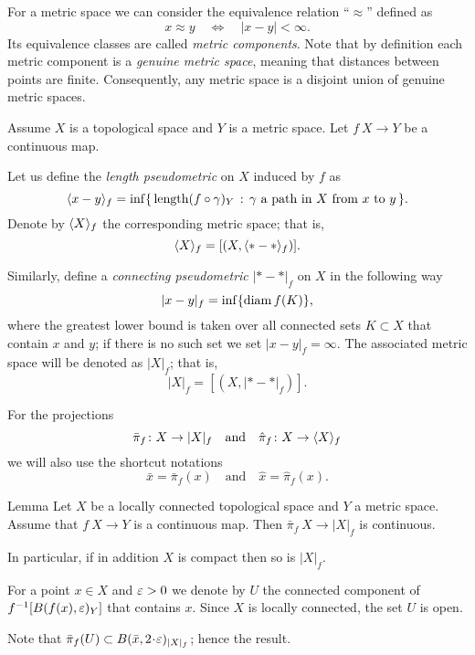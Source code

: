 \documentclass{article}
\begin{document}
For a metric space we can consider the equivalence relation ``$\approx$'' defined as 
\[x\approx y\quad\iff\quad|x-y|<\infty.\]
Its equivalence classes are called \emph{metric components}.
Note that by definition each metric component is a \emph{genuine metric space}, meaning that distances between points are finite.
Consequently, any metric space is a disjoint union of genuine metric spaces.

Assume $X$ is a topological space and $Y$ is a metric space.
Let $f\:X\to Y$ be a continuous map. 

Let us define the \emph{length pseudometric} on $X$ induced by $f$ as
\[\< x-y\>_f
=
\inf
\set{\length(f\circ\gamma)_Y}{\gamma\ \text{a path in}\  X\ \text{from}\ x\ \text{to}\ y}.\]
Denote by $\langle X\rangle_f$ the corresponding metric space; that is,
\[\langle X\rangle_f=[(X,\langle{*}-{*}\rangle_f)].\] 

Similarly, define a \emph{connecting pseudometric} $|{*}-{*}|_f$ on $X$ in
the following way
\[|x-y|_f=\inf\{\mathop{\rm diam}\nolimits f(K)\},\]
where the greatest lower bound is taken over all connected sets $K\subset X$ that contain $x$ and $y$;
if there is no such set we set $|x-y|_f=\infty$. 
The associated metric space will be
denoted as $|X|_f$;
that is,
\[| X|_f=[(X,|{*}-{*}|_f)].\]

For the projections 
\[\bar \pi_f\colon X\to |X|_f\quad\text{and}\quad \hat \pi_f\colon X\to \langle X\rangle_f\]
we will also use the shortcut notations 
\[\bar x=\bar\pi_f(x) \quad\text{and}\quad  \hat x= \hat \pi_f(x).\]

\begin{thm}{Lemma}\label{lem:picont}
Let $X$ be a locally connected topological space and $Y$ a metric space. Assume that $f\:X\to Y$ is a continuous map. 
Then $\bar\pi_f\:X\to|X|_f$ is continuous.

In particular, if in addition $X$ is compact then so is $|X|_f$.
\end{thm}

For a point $x\in X$ and $\varepsilon>0$ we denote by $U$ the connected component of $f^{-1}[B(f(x),\varepsilon)_{Y}]$ that contains $x$.
Since $X$ is locally connected, the set $U$ is open.

Note that $\bar\pi_f(U)\subset B(\bar x,2\cdot \eps)_{|X|_f}$;
hence the result.
\qeds



\begin{wrapfigure}{r}{37 mm}
\end{wrapfigure}
\end{document}
